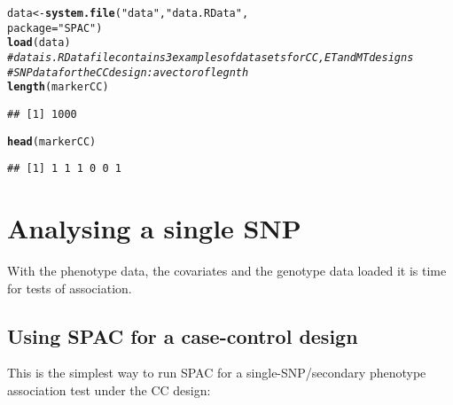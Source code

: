 \documentclass{article}\usepackage[]{graphicx}\usepackage[]{color}
\makeatletter
\newcommand{\hlstr}[1]{\textcolor[rgb]{0.192,0.494,0.8}{#1}}%
\newcommand{\hlcom}[1]{\textcolor[rgb]{0.678,0.584,0.686}{\textit{#1}}}%
\newcommand{\hlstd}[1]{\textcolor[rgb]{0.345,0.345,0.345}{#1}}%
\newcommand{\hlkwb}[1]{\textcolor[rgb]{0.69,0.353,0.396}{#1}}%
\newcommand{\hlkwc}[1]{\textcolor[rgb]{0.333,0.667,0.333}{#1}}%
\newcommand{\hlkwd}[1]{\textcolor[rgb]{0.737,0.353,0.396}{\textbf{#1}}}%
\newenvironment{kframe}{%
 \def\at@end@of@kframe{}%
 \ifinner\ifhmode%
  \def\at@end@of@kframe{\end{minipage}}%
  \begin{minipage}{\columnwidth}%
 \fi\fi%
 \def\FrameCommand##1{\hskip\@totalleftmargin \hskip-\fboxsep
 \colorbox{shadecolor}{##1}\hskip-\fboxsep
     \hskip-\linewidth \hskip-\@totalleftmargin \hskip\columnwidth}%
 \MakeFramed {\advance\hsize-\width
   \@totalleftmargin\z@ \linewidth\hsize
   \@setminipage}}%
 {\par\unskip\endMakeFramed%
 \at@end@of@kframe}
\newenvironment{knitrout}{}{} %
\makeatother
\begin{document}
\begin{itemize}
\begin{knitrout}
\color{fgcolor}\begin{kframe}
\begin{alltt}
  \hlstd{data} \hlkwb{<-} \hlkwd{system.file}\hlstd{(}\hlstr{"data"}\hlstd{,} \hlstr{"data.RData"}\hlstd{,}
                         \hlkwc{package}\hlstd{=}\hlstr{"SPAC"}\hlstd{)}
  \hlkwd{load}\hlstd{(data)}
\hlcom{# data is .RData file contains 3 examples of data sets for CC, ET and MT designs}
\hlcom{# SNP data for the CC design: a vector of legnth}
  \hlkwd{length}\hlstd{(markerCC)}
\end{alltt}
\begin{verbatim}
## [1] 1000
\end{verbatim}
\begin{alltt}
  \hlkwd{head}\hlstd{(markerCC)}
\end{alltt}
\begin{verbatim}
## [1] 1 1 1 0 0 1
\end{verbatim}
\end{kframe}
\end{knitrout}
\end{itemize}

\section{Analysing a single SNP}
\label{sec:analys-single-SNP}
With the phenotype data, the covariates and the genotype data loaded it is time for tests of association.

\subsection{Using SPAC for a case-control design}
\label{sec:using-SPAC-CC}
This is the simplest way to run SPAC for a single-SNP/secondary phenotype association test under the CC design:
\end{document}
